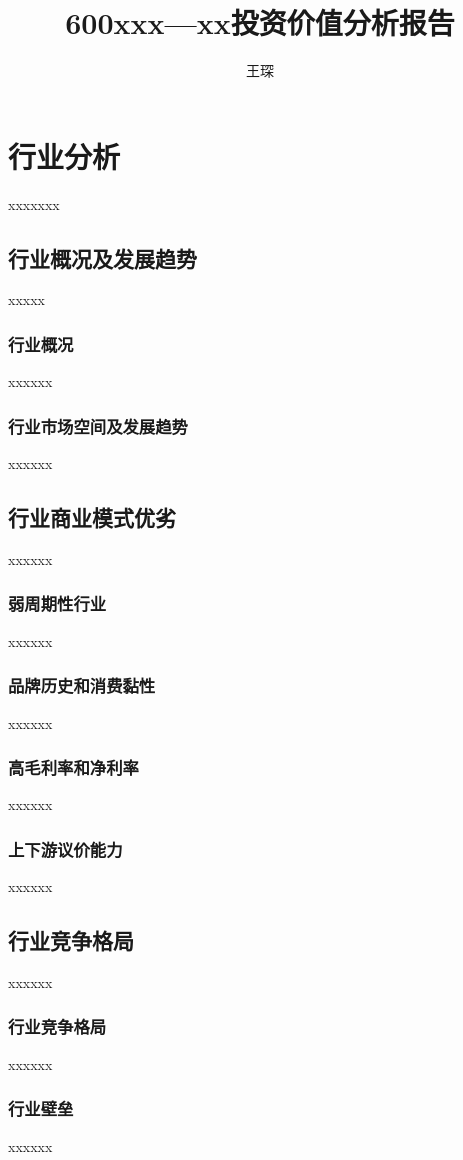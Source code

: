 \documentclass[a4paper,12pt,lang=cn,fontset = windows]{elegantpaper} %
\title{600xxx—xx投资价值分析报告} %
\author{王琛}
\date{\zhtoday}
\begin{document}
\maketitle
\section{行业分析}
xxxxxxx
\subsection{行业概况及发展趋势}
xxxxx
\subsubsection{行业概况}
xxxxxx
\subsubsection{行业市场空间及发展趋势}
xxxxxx
\subsection{行业商业模式优劣}
xxxxxx
\subsubsection{弱周期性行业}
xxxxxx
\subsubsection{品牌历史和消费黏性}
xxxxxx
\subsubsection{高毛利率和净利率}
xxxxxx
\subsubsection{上下游议价能力}
xxxxxx
\subsection{行业竞争格局} %
xxxxxx
\subsubsection{行业竞争格局}
xxxxxx
\subsubsection{行业壁垒}
xxxxxx
\end{document}

